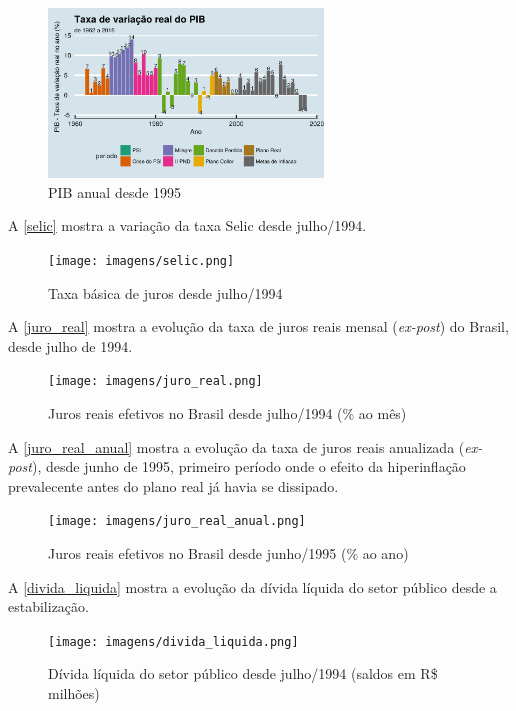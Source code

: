 \documentclass[]{article}
\begin{document}
\begin{figure}
\centering
\includegraphics[width=0.65000\textwidth]{imagens/PIB_anual.png}
\caption{PIB anual desde 1995}\label{PIB_anual}
\end{figure}

A \autoref{selic} mostra a variação da taxa Selic desde julho/1994.

\begin{figure}
\centering
\texttt{[image: imagens/selic.png]}
\caption{Taxa básica de juros desde julho/1994}\label{selic}
\end{figure}

A \autoref{juro_real} mostra a evolução da taxa de juros reais mensal
(\emph{ex-post}) do Brasil, desde julho de 1994.

\begin{figure}
\centering
\texttt{[image: imagens/juro\_real.png]}
\caption{Juros reais efetivos no Brasil desde julho/1994 (\% ao
mês)}\label{juro_real}
\end{figure}

A \autoref{juro_real_anual} mostra a evolução da taxa de juros reais
anualizada (\emph{ex-post}), desde junho de 1995, primeiro período onde
o efeito da hiperinflação prevalecente antes do plano real já havia se
dissipado.

\begin{figure}
\centering
\texttt{[image: imagens/juro\_real\_anual.png]}
\caption{Juros reais efetivos no Brasil desde junho/1995 (\% ao
ano)}\label{juro_real_anual}
\end{figure}

A \autoref{divida_liquida} mostra a evolução da dívida líquida do setor
público desde a estabilização.

\begin{figure}
\centering
\texttt{[image: imagens/divida\_liquida.png]}
\caption{Dívida líquida do setor público desde julho/1994 (saldos em R\$
milhões)}\label{divida_liquida}
\end{figure}
\end{document}
